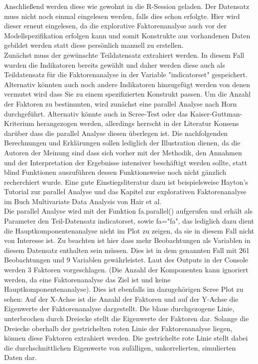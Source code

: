 \documentclass{article}\usepackage[]{graphicx}\usepackage[]{color}
\begin{document}
Anschließend werden diese wie gewohnt in die R-Session geladen. Der Datensatz muss nicht noch einmal eingelesen werden, falls dies schon erfolgte. Hier wird dieser erneut eingelesen, da die explorative Faktorenanalyse auch vor der Modellspezifikation erfolgen kann und somit Konstrukte aus vorhandenen Daten gebildet werden statt diese persönlich manuell zu erstellen.\\
Zunächst muss der gewünschte Teildatensatz extrahiert werden. In diesem Fall wurden die Indikatoren bereits gewählt und daher werden diese auch als Teildatensatz für die Faktorenanalyse in der Variable "indicatorset" gespeichert. Alternativ könnten auch noch andere Indikatoren hinzugefügt werden von denen vermutet wird dass Sie zu einem spezifizierten Konstrukt passen. Um die Anzahl der Faktoren zu bestimmten, wird zunächst eine parallel Analyse nach Horn\cite{horn1965rationale} durchgeführt. Alternativ könnte auch in Scree-Test oder das Kaiser-Guttman-Kriterium herangezogen werden, allerdings herrscht in der Literatur Konsens darüber dass die parallel Analyse diesen überlegen ist.\cite{dinno2009exploring} Die nachfolgenden Berechnungen und Erklärungen sollen lediglich der Illustration dienen, da die Autoren der Meinung sind dass sich vorher mit der Methodik, den Annahmen und der Interpretation der Ergebnisse intensiver beschäftigt werden sollte, statt blind Funktionen auszuführen dessen Funktionsweise noch nicht gänzlich recherchiert wurde. Eine gute Einstiegsliteratur dazu ist beispielsweise Hayton's Tutorial zur parallel Analyse\cite{hayton2004factor} und das Kapitel zur explorativen Faktorenanalyse im Buch Multivariate Data Analysis von Hair et al.\cite{hair2006multivariate}\\
Die parallel Analyse wird mit der Funktion fa.parallel() aufgerufen und erhält als Parameter den Teil-Datensatz indicatorset, sowie fa="fa", das lediglich dazu dient die Hauptkomponentenanalyse nicht im Plot zu zeigen, da sie in diesem Fall nicht von Interesse ist. Zu beachten ist hier dass mehr Beobachtungen als Variablen in diesem Datensatz enthalten sein müssen. Dies ist in dem genannten Fall mit 261 Beobachtungen und 9 Variablen gewährleistet. Laut des Outputs in der Console werden 3 Faktoren vorgeschlagen. (Die Anzahl der Komponenten kann ignoriert werden, da eine Faktorenanalyse das Ziel ist und keine Hauptkomponentenanalyse). Dies ist ebenfalls im dazugehörigen Scree Plot zu sehen: Auf der X-Achse ist die Anzahl der Faktoren und auf der Y-Achse die Eigenwerte der Faktorenanalyse dargestellt. Die blaue durchgezogene Linie, unterbrochen durch Dreiecke stellt die Eigenwerte der Faktoren dar. Solange die Dreiecke oberhalb der gestrichelten roten Linie der Faktorenanalyse liegen, können diese Faktoren extrahiert werden. Die gestrichelte rote Linie stellt dabei die durchschnittlichen Eigenwerte von zufälligen, unkorrelierten, simulierten Daten dar.\\
\end{document}
